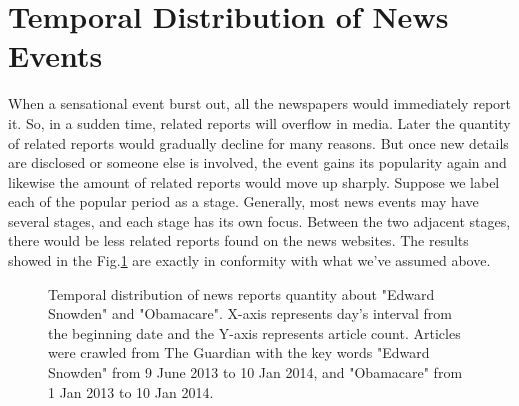\documentclass[runningheads,a4paper]{llncs}
\begin{document}
\section{Temporal Distribution of News Events}
\label{temporal distribution of news events}
When a sensational event burst out, all the newspapers would immediately report it. So, in a sudden time, related reports will overflow in media. Later the quantity of related reports would gradually decline for many reasons. But once new details are disclosed or someone else is involved, the event gains its popularity again and likewise the amount of related reports would move up sharply. Suppose we label each of the popular period as a stage. Generally, most news events may have several stages, and each stage has its own focus. Between the two adjacent stages, there would be less related reports found on the news websites. The results showed in the Fig.\ref{temporal distribution} are exactly in conformity with what we've assumed above. 
\begin{figure}[htb]
	\caption{Temporal distribution of news reports quantity about "Edward Snowden" and "Obamacare". X-axis represents day's interval from the beginning date and the Y-axis represents article count. Articles were crawled from The Guardian with the key words "Edward Snowden" from 9 June 2013 to 10 Jan 2014, and "Obamacare" from 1 Jan 2013 to 10 Jan 2014.}
	\label{temporal distribution}
\end{figure}
\end{document}
